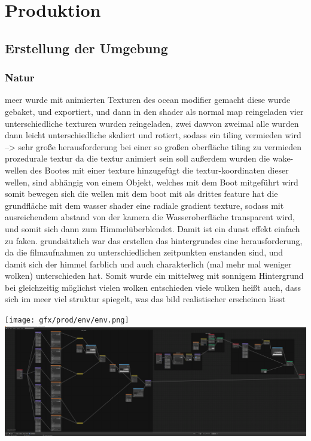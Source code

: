 \chapter{Produktion}

\section{Erstellung der Umgebung}

\subsection{Natur}

meer wurde mit animierten Texturen des ocean modifier gemacht
diese wurde gebaket, und exportiert, und dann in den shader als normal map reingeladen
vier unterschiedliche texturen wurden reingeladen, zwei dawvon zweimal
alle wurden dann leicht unterschiedliche skaliert und rotiert, sodass ein tiling vermieden wird
--> sehr große herausforderung bei einer so großen oberfläche tiling zu vermieden
prozedurale textur da die textur animiert sein soll
außerdem wurden die wake-wellen des Bootes mit einer texture hinzugefügt
die textur-koordinaten dieser wellen, sind abhängig von einem Objekt, welches mit dem Boot mitgeführt wird
somit bewegen sich die wellen mit dem boot mit
als drittes feature hat die grundfläche mit dem wasser shader eine radiale gradient texture, sodass mit ausreichendem abstand von der kamera die Wasseroberfläche transparent wird, und somit sich dann zum Himmelüberblendet. Damit ist ein dunst effekt einfach zu faken.
grundsätzlich war das erstellen das hintergrundes eine herausforderung, da die filmaufnahmen zu unterschiedlichen zeitpunkten enstanden sind, und damit sich der himmel farblich und auch charakterlich (mal mehr mal weniger wolken) unterschieden hat. Somit wurde ein mittelweg mit sonnigem Hintergrund bei gleichzeitig möglichst vielen wolken entschieden
viele wolken heißt auch, dass sich im meer viel struktur spiegelt, was das bild realistischer erscheinen lässt

\texttt{[image: gfx/prod/env/env.png]}
\includegraphics{gfx/prod/env/ocean_shader.png}


